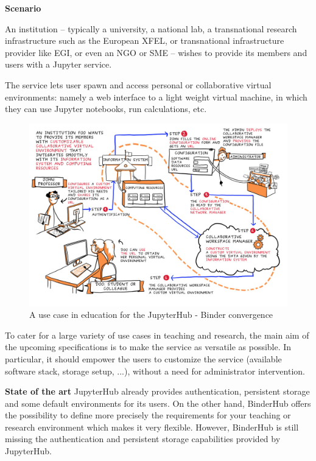 \begin{task}[
  title=JupyterHub / BinderHub convergence,
  id=jh-bh-conv,
  lead=EP,
  PM=16, %
  wphases={0-36!.5},
  partners={WTT}]

  \textbf{Scenario}

  An institution -- typically a university, a national lab, a transnational
  research infrastructure such as the European XFEL, or transnational
  infrastructure provider like EGI, or even an NGO or SME -- wishes to provide its members and
  users with a Jupyter service.

  The service lets user spawn and access personal or collaborative virtual
  environments: namely a web interface to a light weight virtual machine,
  in which they can use Jupyter notebooks, run calculations, etc.

  \begin{figure}
    \begin{center}
      \includegraphics[width=.75\textwidth]{images/jupyterhub-binder-convergence.jpg}
    \end{center}
    \caption{A use case in education for the JupyterHub - Binder convergence}
    \label{fig:jupyterhub-binder}
  \end{figure}

  To cater for a large variety of use cases in teaching and research,
  the main aim of the upcoming specifications is to make the service as
  versatile as possible. In particular, it should empower the users to 
  customize the service (available software stack, storage setup, ...),
  without a need for administrator intervention.

  \textbf{State of the art}
  JupyterHub already provides authentication, persistent storage and some
  default environments for its users. On the other hand, BinderHub offers
  the possibility to define more precisely the requirements for your teaching
  or research environment which makes it very flexible. However, BinderHub is still missing the  
  authentication and persistent storage capabilities provided by JupyterHub.


\end{task}
